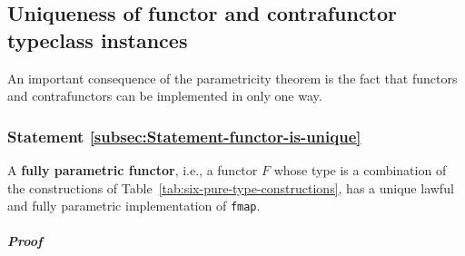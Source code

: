 \subsection{Uniqueness of functor and contrafunctor typeclass instances\label{sec:Uniqueness-of-functor-and-contrafunctor}}

An important consequence of the parametricity theorem is the fact
that functors and contrafunctors can be implemented in only one way.

\subsubsection{Statement \label{subsec:Statement-functor-is-unique}\ref{subsec:Statement-functor-is-unique}}

A \textbf{fully parametric functor},
i.e., a functor $F$ whose type is a combination of the constructions
of Table~\ref{tab:six-pure-type-constructions}, has a unique lawful
and fully parametric implementation of \lstinline!fmap!. 

\subparagraph{Proof}

